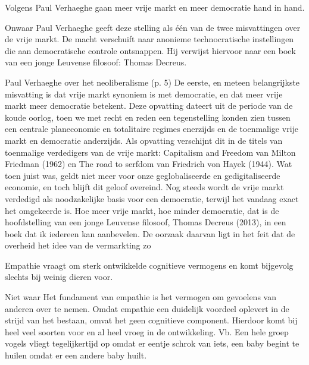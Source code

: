 \documentclass[main.tex]{subfiles}
\begin{document}
\begin{examenvraag}
    \begin{stelling}
        Volgens Paul Verhaeghe gaan meer vrije markt en meer democratie hand in hand.
    \end{stelling}

    \begin{stelling-antwoord}{Onwaar}
        Paul Verhaeghe geeft deze stelling als \'e\'en van de twee misvattingen over de vrije markt.
        De macht verschuift naar anonieme technocratische instellingen die aan democratische
        controle ontsnappen.
        Hij verwijst hiervoor naar een boek van een jonge Leuvense filosoof: Thomas Decreus.
        \begin{citaat}{Paul Verhaeghe over het neoliberalisme (p. 5)}
            De eerste, en meteen belangrijkste misvatting is dat vrije markt synoniem is met democratie, en dat meer vrije markt meer democratie betekent.
            Deze opvatting dateert uit de periode van de koude oorlog, toen we met recht en reden een tegenstelling konden zien tussen een centrale planeconomie en totalitaire regimes enerzijds en de toenmalige vrije markt en democratie anderzijds.
            Als opvatting verschijnt dit in de titels van toenmalige verdedigers van de vrije markt: Capitalism and Freedom van Milton Friedman (1962) en The road to serfdom van Friedrich von Hayek (1944).
            Wat toen juist was, geldt niet meer voor onze geglobaliseerde en gedigitaliseerde economie, en toch blijft dit geloof overeind.
            Nog steeds wordt de vrije markt verdedigd als noodzakelijke basis voor een democratie, terwijl het vandaag exact het omgekeerde is.
            Hoe meer vrije markt, hoe minder democratie, dat is de hoofdstelling van een jonge Leuvense filosoof, Thomas Decreus (2013), in een boek dat ik iedereen kan aanbevelen.
            De oorzaak daarvan ligt in het feit dat de overheid het idee van de vermarkting zo
        \end{citaat}
    \end{stelling-antwoord}
\end{examenvraag}


\begin{examenvraag}
    \begin{stelling}
        Empathie vraagt om sterk ontwikkelde cognitieve vermogens en komt bijgevolg slechts bij weinig dieren voor.
    \end{stelling}

    \begin{stelling-antwoord}{Niet waar}
    Het fundament van empathie is het vermogen om gevoelens van anderen over te nemen.‭ ‬Omdat 
    empathie een duidelijk voordeel oplevert in de strijd van het bestaan,‭ ‬omvat het geen 
    cognitieve component.‭ ‬Hierdoor komt bij heel veel soorten voor en al heel vroeg in de 
    ontwikkeling.‭ ‬Vb.‭ ‬Een hele groep vogels vliegt tegelijkertijd op omdat er‭ ‬eentje schrok van 
    iets,‭ ‬een baby begint te huilen omdat er een andere baby huilt.
    \end{stelling-antwoord}
\end{examenvraag}
\end{document}
